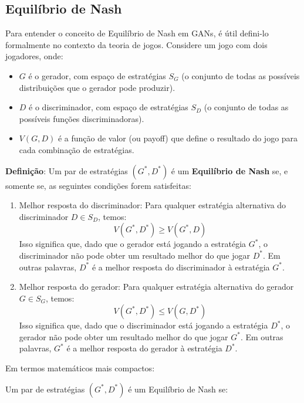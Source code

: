 \documentclass{tufte-handout}
\begin{document}
\subsection{Equilíbrio de Nash}

Para entender o conceito de Equilíbrio de Nash em GANs, é útil defini-lo formalmente no contexto da teoria de jogos. Considere um jogo com dois jogadores, onde:

\begin{itemize}
    \item $G$ é o gerador, com espaço de estratégias $S_G$ (o conjunto de todas as possíveis distribuições que o gerador pode produzir).
    \item $D$ é o discriminador, com espaço de estratégias $S_D$ (o conjunto de todas as possíveis funções discriminadoras).
    \item $V(G, D)$ é a função de valor (ou payoff) que define o resultado do jogo para cada combinação de estratégias.
\end{itemize}

\textbf{Definição}: Um par de estratégias $(G^*, D^*)$ é um \textbf{Equilíbrio de Nash} se, e somente se, as seguintes condições forem satisfeitas:
\begin{enumerate}
    \item Melhor resposta do discriminador: Para qualquer estratégia alternativa do discriminador $D \in S_D$, temos:
    \begin{equation}
    V(G^*, D^*) \geq V(G^*, D)
    \end{equation}
    Isso significa que, dado que o gerador está jogando a estratégia $G^*$, o discriminador não pode obter um resultado melhor do que jogar $D^*$. Em outras palavras, $D^*$ é a melhor resposta do discriminador à estratégia $G^*$.
    \item Melhor resposta do gerador: Para qualquer estratégia alternativa do gerador $G \in S_G$, temos:
    \begin{equation}
    V(G^*, D^*) \leq V(G, D^*)
    \end{equation}
    Isso significa que, dado que o discriminador está jogando a estratégia $D^*$, o gerador não pode obter um resultado melhor do que jogar $G^*$. Em outras palavras, $G^*$ é a melhor resposta do gerador à estratégia $D^*$.
\end{enumerate}
    
Em termos matemáticos mais compactos:

Um par de estratégias $(G^*, D^*)$ é um Equilíbrio de Nash se:
\end{document}
